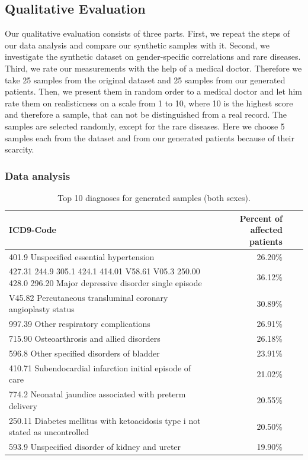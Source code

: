 \documentclass[11pt, a4paper]{book}
\begin{document}
\subsection{Qualitative Evaluation}
Our qualitative evaluation consists of three parts. First, we repeat the steps of our data analysis and compare our synthetic samples with it. Second, we investigate the synthetic dataset on gender-specific correlations and rare diseases. Third, we rate our measurements with the help of a medical doctor. Therefore we take 25 samples from the original dataset and 25 samples from our generated patients. Then, we present them in random order to a medical doctor and let him rate them on realisticness on a scale from 1 to 10, where 10 is the highest score and therefore a sample, that can not be distinguished from a real record.
The samples are selected randomly, except for the rare diseases. Here we choose 5 samples each from the dataset and from our generated patients because of their scarcity.

\subsubsection{Data analysis}

\begin{table}
\begin{tabularx}{\textwidth}{p{}|r|X|r}
\textbf{ICD9-Code} & \textbf{Percent of affected patients}\\
\hline
401.9 Unspecified essential hypertension & 26.20\%\\
427.31
244.9
305.1
424.1
414.01
V58.61
V05.3
250.00
428.0
296.20 Major depressive disorder single episode & 36.12\%\\
V45.82 Percutaneous transluminal coronary angioplasty status & 30.89\%\\
997.39 Other respiratory complications & 26.91\%\\
715.90 Osteoarthrosis and allied disorders & 26.18\%\\
596.8 Other specified disorders of bladder & 23.91\%\\
410.71 Subendocardial infarction initial episode of care & 21.02\%\\
774.2 Neonatal jaundice associated with preterm delivery & 20.55\%\\
250.11 Diabetes mellitus with ketoacidosis type i not stated as uncontrolled & 20.50\%\\
593.9 Unspecified disorder of kidney and ureter & 19.90\%\\
\end{tabularx}
\caption{\label{tab:top10-icd-mixed}Top 10 diagnoses for generated samples (both sexes).}
\end{table}
\end{document}
